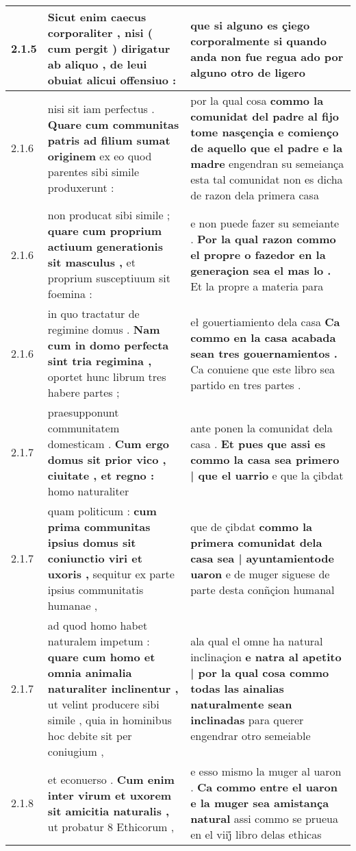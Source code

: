 \begin{tabular}{|p{1cm}|p{6.5cm}|p{6.5cm}|}
2.1.5 & Sicut enim caecus corporaliter , \textbf{ nisi ( cum pergit ) dirigatur ab aliquo , } de leui obuiat alicui offensiuo : & que si alguno es çiego corporalmente \textbf{ si quando anda non fue regua ado } por alguno otro de ligero \\\hline
2.1.6 & nisi sit iam perfectus . \textbf{ Quare cum communitas patris ad filium sumat originem } ex eo quod parentes sibi simile produxerunt : & por la qual cosa \textbf{ commo la comunidat del padre al fijo tome nasçençia e comienço de aquello que el padre e la madre } engendran su semeiança esta tal comunidat non es dicha de razon dela primera casa \\\hline
2.1.6 & non producat sibi simile ; \textbf{ quare cum proprium actiuum generationis sit masculus , } et proprium susceptiuum sit foemina : & e non puede fazer su semeiante . \textbf{ Por la qual razon commo el propre o fazedor en la generaçion sea el mas lo . } Et la propre a materia para \\\hline
2.1.6 & in quo tractatur de regimine domus . \textbf{ Nam cum in domo perfecta sint tria regimina , } oportet hunc librum tres habere partes ; & eł gouertiamiento dela casa \textbf{ Ca commo en la casa acabada sean tres gouernamientos . } Ca conuiene que este libro sea partido en tres partes . \\\hline
2.1.7 & praesupponunt communitatem domesticam . \textbf{ Cum ergo domus sit prior vico , ciuitate , et regno : } homo naturaliter & ante ponen la comunidat dela casa . \textbf{ Et pues que assi es commo la casa sea primero | que el uarrio } e que la çibdat \\\hline
2.1.7 & quam politicum : \textbf{ cum prima communitas ipsius domus sit coniunctio viri et uxoris , } sequitur ex parte ipsius communitatis humanae , & que de çibdat \textbf{ commo la primera comunidat dela casa sea | ayuntamientode uaron } e de muger siguese de parte desta conñçion humanal \\\hline
2.1.7 & ad quod homo habet naturalem impetum : \textbf{ quare cum homo et omnia animalia naturaliter inclinentur , } ut velint producere sibi simile , quia in hominibus hoc debite sit per coniugium , & ala qual el omne ha natural inclinaçion \textbf{ e natra al apetito | por la qual cosa commo todas las ainalias naturalmente sean inclinadas } para querer engendrar otro semeiable \\\hline
2.1.8 & et econuerso . \textbf{ Cum enim inter virum et uxorem sit amicitia naturalis , } ut probatur 8 Ethicorum , & e esso mismo la muger al uaron . \textbf{ Ca commo entre el uaron e la muger sea amistança natural } assi commo se prueua en el viij̊ libro delas ethicas \\\hline

\end{tabular}
